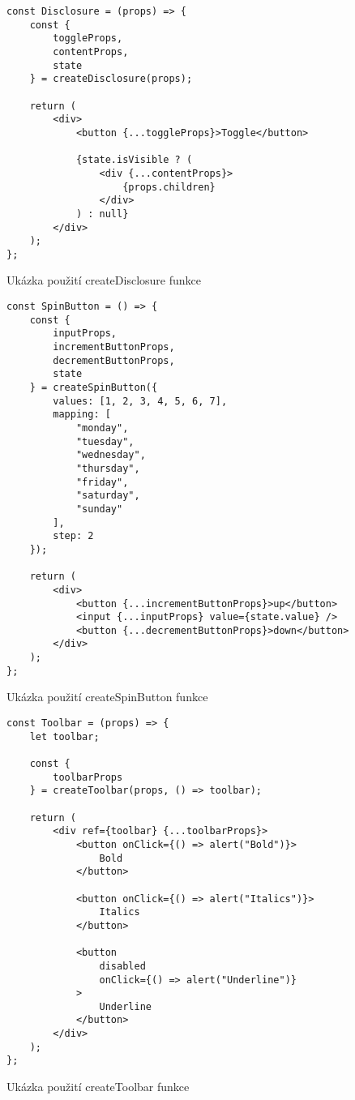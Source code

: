 \clearpage

\begin{listing}
    \begin{verbatim}
const Disclosure = (props) => {
    const {
        toggleProps,
        contentProps,
        state
    } = createDisclosure(props);

    return (
        <div>
            <button {...toggleProps}>Toggle</button>

            {state.isVisible ? (
                <div {...contentProps}>
                    {props.children}
                </div>
            ) : null}
        </div>
    );
};
\end{verbatim}
    \caption{Ukázka použití createDisclosure funkce}
    \label{disclosure-example}
\end{listing}

\begin{listing}
    \begin{verbatim}
const SpinButton = () => {
    const { 
        inputProps,
        incrementButtonProps,
        decrementButtonProps,
        state
    } = createSpinButton({
        values: [1, 2, 3, 4, 5, 6, 7],
        mapping: [
            "monday",
            "tuesday",
            "wednesday",
            "thursday",
            "friday",
            "saturday",
            "sunday"
        ],
        step: 2
    });

    return (
        <div>
            <button {...incrementButtonProps}>up</button>
            <input {...inputProps} value={state.value} />
            <button {...decrementButtonProps}>down</button>
        </div>
    );
};
\end{verbatim}
    \caption{Ukázka použití createSpinButton funkce}
    \label{spinbutton-example}
\end{listing}

\begin{listing}
    \begin{verbatim}
const Toolbar = (props) => {
    let toolbar;

    const {
        toolbarProps
    } = createToolbar(props, () => toolbar);

    return (
        <div ref={toolbar} {...toolbarProps}>
            <button onClick={() => alert("Bold")}>
                Bold
            </button>

            <button onClick={() => alert("Italics")}>
                Italics
            </button>

            <button
                disabled
                onClick={() => alert("Underline")}
            >
                Underline
            </button>
        </div>
    );
};
\end{verbatim}
    \caption{Ukázka použití createToolbar funkce}
    \label{toolbar-example}
\end{listing}

